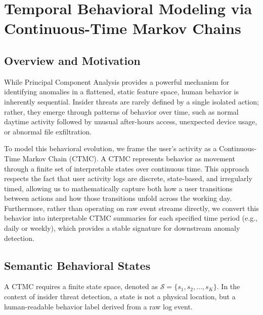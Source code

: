 

\chapter{Temporal Behavioral Modeling via Continuous-Time Markov Chains}
\label{ch:ctmc}

\section{Overview and Motivation}
While Principal Component Analysis provides a powerful mechanism for identifying anomalies in a flattened, static feature space, human behavior is inherently sequential. Insider threats are rarely defined by a single isolated action; rather, they emerge through patterns of behavior over time, such as normal daytime activity followed by unusual after-hours access, unexpected device usage, or abnormal file exfiltration.

To model this behavioral evolution, we frame the user's activity as a Continuous-Time Markov Chain (CTMC). A CTMC represents behavior as movement through a finite set of interpretable states over continuous time. This approach respects the fact that user activity logs are discrete, state-based, and irregularly timed, allowing us to mathematically capture both how a user transitions between actions and how those transitions unfold across the working day. Furthermore, rather than operating on raw event streams directly, we convert this behavior into interpretable CTMC summaries for each specified time period (e.g., daily or weekly), which provides a stable signature for downstream anomaly detection.

\section{Semantic Behavioral States}
A CTMC requires a finite state space, denoted as $\mathcal{S}=\{s_1, s_2, \dots, s_K\}$. In the context of insider threat detection, a state is not a physical location, but a human-readable behavior label derived from a raw log event.

